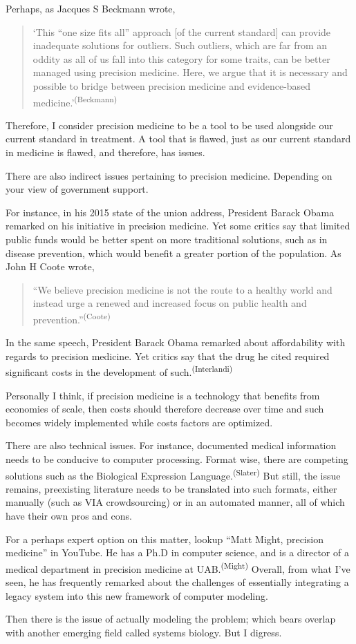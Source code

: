 Perhaps,  as Jacques S Beckmann wrote,
\begin{quotation}
`This ``one size fits all'' approach [of the current standard] can provide inadequate solutions for outliers. Such outliers, which are far from an oddity as all of us fall into this category for some traits, can be better managed using precision medicine. Here, we argue that it is necessary and possible to bridge between precision medicine and evidence-based medicine.'\textsuperscript{(Beckmann)}
\end{quotation}

Therefore, I consider precision medicine to be a tool to be used alongside our current standard in treatment. A tool that is flawed, just as our current standard in medicine is flawed, and therefore, has issues.

There are also indirect issues pertaining to precision medicine. Depending on your view of government support.

For instance, in his 2015 state of the union address, President Barack Obama remarked on his initiative in precision medicine. Yet some critics say that limited public funds would be better spent on more traditional solutions, such as in disease prevention, which would benefit a greater portion of the population. As John H Coote wrote,
\begin{quotation}
    ``We believe precision medicine is not the route to a healthy world and instead urge a renewed and increased focus on public health and prevention.''\textsuperscript{(Coote)}
\end{quotation}

In the same speech, President Barack Obama remarked about affordability with regards to precision medicine. Yet critics say that the drug he cited required significant costs in the development of such.\textsuperscript{(Interlandi)}

Personally I think, if precision medicine is a technology that benefits from economies of scale, then costs should therefore decrease over time and such becomes widely implemented while costs factors are optimized. 

There are also technical issues. For instance, documented medical information needs to be conducive to computer processing. Format wise, there are competing solutions such as the Biological Expression Language.\textsuperscript{(Slater)} But still, the issue remains, preexisting literature needs to be translated into such formats, either manually (such as VIA crowdsourcing) or in an automated manner, all of which have their own pros and cons. 

For a perhaps expert option on this matter, lookup ``Matt Might, precision medicine'' in YouTube. He has a Ph.D in computer science, and is a director of a medical department in precision medicine at UAB.\textsuperscript{(Might)} Overall, from what I've seen, he has frequently remarked about the challenges of essentially integrating a legacy system into this new framework of computer modeling. 


Then there is the issue of actually modeling the problem; which bears overlap with another emerging field called systems biology. But I digress.



